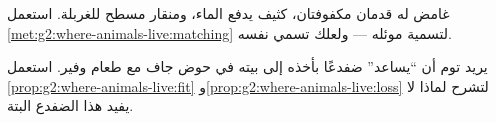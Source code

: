 \begin{exercise}[$\star\star$]\label{exo:g2:where-animals-live:9}
 غامض له قدمان مكفوفتان،  كثيف يدفع الماء، ومنقار مسطح
للغربلة. استعمل \cref{met:g2:where-animals-live:matching} لتسمية
موئله --- ولعلك تسمي  نفسه.
\end{exercise}

\begin{exercise}[$\star\star$]\label{exo:g2:where-animals-live:10}
يريد توم أن ``يساعد'' ضفدعًا بأخذه إلى بيته في حوض جاف مع طعام
وفير. استعمل \cref{prop:g2:where-animals-live:fit}
و\cref{prop:g2:where-animals-live:loss} لتشرح لماذا لا يفيد هذا
الضفدع البتة.
\end{exercise}

